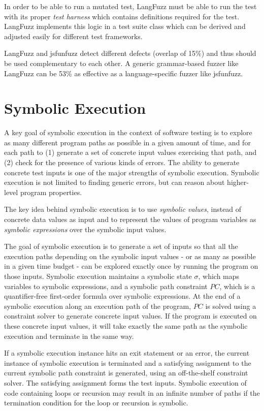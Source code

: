 In order to be able to run a mutated test, LangFuzz must be able to run the test with its proper \textit{test harness} which contains definitions required for the test.
LangFuzz implements this logic in a test suite class which can be derived and adjusted easily for different test frameworks.

LangFuzz and jsfunfuzz detect different defects (overlap of 15\%) and thus should be used complementary to each other.
A generic grammar-based fuzzer like LangFuzz can be 53\% as effective as a language-specific fuzzer like jsfunfuzz.

\section{Symbolic Execution\cite{cadar2013symbolic}}

A key goal of symbolic execution in the context of software testing is to explore as many different program paths as possible in a given amount of time, and for each path to (1) generate a set of concrete input values exercising that path, and (2) check for the presence of various kinds of errors. The ability to generate concrete test inputs is one of the major strengths of symbolic execution.
Symbolic execution is not limited to finding generic errors, but can reason about higher-level program properties.

The key idea behind symbolic execution is to use \textit{symbolic values}, instead of concrete data values as input and to represent the values of program variables as \textit{symbolic expressions} over the symbolic input values.

The goal of symbolic execution is to generate a set of inputs so that all the execution paths depending on the symbolic input values - or as many as possible in a given time budget - can be explored exactly once by running the program on those inputs.
Symbolic execution maintains a symbolic state $\sigma$, which maps variables to symbolic expressions, and a symbolic path constraint $PC$, which is a quantifier-free first-order formula over symbolic expressions.
At the end of a symbolic execution along an execution path of the program, $PC$ is solved using a constraint solver to generate concrete input values. If the program is executed on these concrete input values, it will take exactly the same path as the symbolic execution and terminate in the same way.

If a symbolic execution instance hits an exit statement or an error, the current instance of symbolic execution is terminated and a satisfying assignment to the current symbolic path constraint is generated, using an off-the-shelf constraint solver. The satisfying assignment forms the test inputs.
Symbolic execution of code containing loops or recursion may result in an infinite number of paths if the termination condition for the loop or recursion is symbolic.

